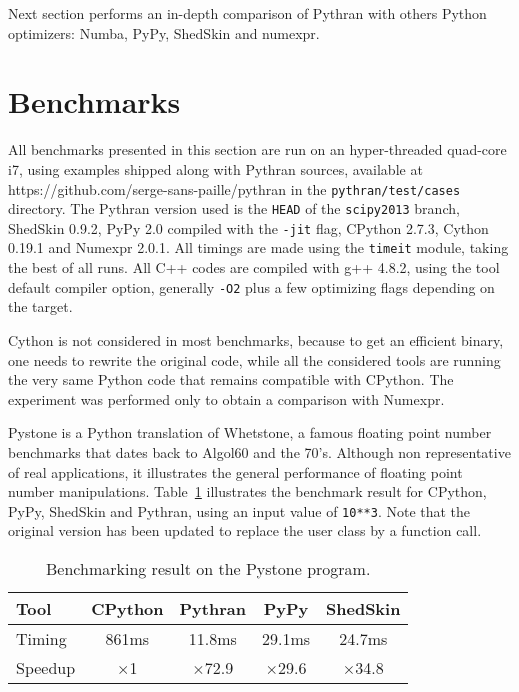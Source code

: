 \documentclass[10pt, onecolumn, preprint]{sigplanconf}
\begin{document}

Next section performs an in-depth comparison of Pythran with others Python
optimizers: Numba, PyPy, ShedSkin and numexpr.


\section{Benchmarks}
\label{sec:benchmarks}


All benchmarks presented in this section are run on an hyper-threaded quad-core
i7, %
using examples shipped along with Pythran sources, available at
https://github.com/serge-sans-paille/pythran in the \texttt{pythran/test/cases}
directory. The Pythran version used is the \texttt{HEAD} of the \texttt{scipy2013} branch,
ShedSkin 0.9.2, PyPy 2.0 compiled with the \texttt{-jit} flag, CPython 2.7.3, Cython
0.19.1 and Numexpr 2.0.1. All timings are made using the \texttt{timeit} module,
taking the best of all runs. All C++ codes are compiled with g++ 4.8.2, using
the tool default compiler option, generally \texttt{-O2} plus a few optimizing flags
depending on the target.

Cython is not considered in most benchmarks, because to get an efficient
binary, one needs to rewrite the original code, while all the considered tools
are running the very same Python code that remains compatible with CPython. The
experiment was performed only to obtain a comparison with Numexpr.

Pystone is a Python translation of Whetstone, a famous floating point number
benchmarks that dates back to Algol60 and the 70's. Although non representative
of real applications, it illustrates the general performance of floating point
number manipulations. Table~\ref{tbl:pystone}  illustrates the benchmark
result for CPython, PyPy, ShedSkin and Pythran, using an input value of
\texttt{10**3}. Note that the original version has been updated to replace the user
class by a function call.

\begin{table}
    \centering

    \begin{tabular}{|l|c|c|c|c|}
        \hline
     Tool    &  CPython    &   Pythran     &     PyPy   &  ShedSkin  \\
    \hline
     Timing  &  861ms      &   11.8ms      &     29.1ms &  24.7ms    \\
    \hline
     Speedup &  $\times$1         &   $\times$72.9       &    $\times$29.6   &  $\times$34.8     \\
    \hline
\end{tabular}

    \caption{Benchmarking result on the Pystone program.}
    \label{tbl:pystone}

\end{table}
\end{document}
